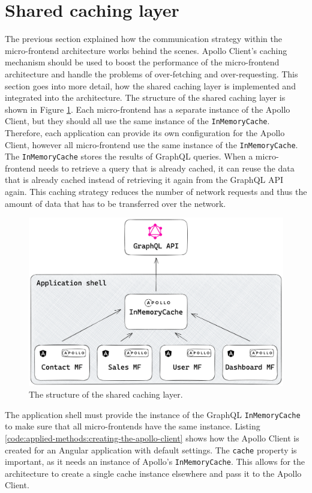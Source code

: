 \section{Shared caching layer}\label{section:applied-methods:shared-caching-layer}

The previous section explained how the communication strategy within the micro-frontend architecture works behind the scenes. Apollo Client's caching mechanism should be used to boost the performance of the micro-frontend architecture and handle the problems of over-fetching and over-requesting. This section goes into more detail, how the shared caching layer is implemented and integrated into the architecture. The structure of the shared caching layer is shown in Figure \ref{fig:applied-methods:structure-shared-caching-layer}. Each micro-frontend has a separate instance of the Apollo Client, but they should all use the same instance of the \texttt{InMemoryCache}. Therefore, each application can provide its own configuration for the Apollo Client, however all micro-frontend use the same instance of the \texttt{InMemoryCache}. The \texttt{InMemoryCache} stores the results of GraphQL queries. When a micro-frontend needs to retrieve a query that is already cached, it can reuse the data that is already cached instead of retrieving it again from the GraphQL \ac{API} again. This caching strategy reduces the number of network requests and thus the amount of data that has to be transferred over the network.

\ifshowImages
  \begin{figure}[H]
  \centering
  \includegraphics[width=0.7\linewidth]{images/applied-methods/shared-caching-layer/shared-caching-layer.png}
  \caption{The structure of the shared caching layer.}\label{fig:applied-methods:structure-shared-caching-layer}
  \end{figure}
\fi

\noindent The application shell must provide the instance of the GraphQL \texttt{InMemoryCache} to make sure that all micro-frontends have the same instance. Listing \ref{code:applied-methods:creating-the-apollo-client} shows how the Apollo Client is created for an Angular application with default settings. The \texttt{cache} property is important, as it needs an instance of Apollo's \texttt{InMemoryCache}. This allows for the architecture to create a single cache instance elsewhere and pass it to the Apollo Client. 

